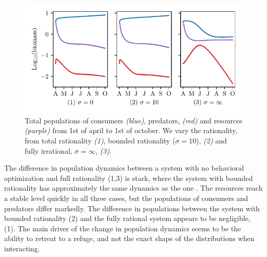 \begin{figure}[H]
\includegraphics{plots/populations.pdf}
\caption{Total populations of consumers \emph{(blue)}, predators, \emph{(red)} and resources \emph{(purple)} from 1st of april to 1st of october. We vary the rationality, from total rationality \emph{(1)}, bounded rationality ($\sigma = 10$), \emph{(2)} and fully irrational, $\sigma = \infty$, \emph{(3)}.}
\label{fig:long_term_populations}
\end{figure}
The difference in population dynamics between a system with no behavioral optimization and full rationality (1,3) is stark, where the system with bounded rationality has approximately the same dynamics as the one . The resources reach a stable level quickly in all three cases, but the populations of consumers and predators differ markedly. The difference in populations between the system with bounded rationality (2) and the fully rational system appears to be negligible, (1). The main driver of the change in population dynamics seems to be the ability to retreat to a refuge, and not the exact shape of the distributions when interacting.


